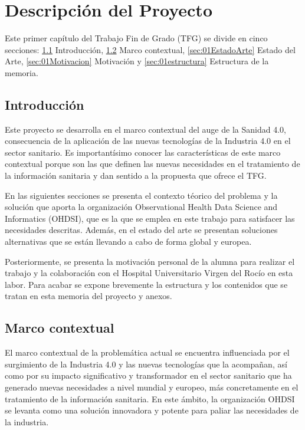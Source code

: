 \chapter{Descripción del Proyecto}\label{cap:01introduccion}

Este primer capítulo del Trabajo Fin de Grado (TFG) se divide en cinco secciones: \ref{sec:01intro} Introducción, \ref{sec:01Contexto} Marco contextual, \ref{sec:01EstadoArte} Estado del Arte, \ref{sec:01Motivacion} Motivación y \ref{sec:01estructura} Estructura de la memoria.

\section{Introducción} \label{sec:01intro}

Este proyecto se desarrolla en el marco contextual del auge de la Sanidad 4.0, consecuencia de la aplicación de las nuevas tecnologías de la Industria 4.0 en el sector sanitario. Es importantísimo conocer las características de este marco contextual porque son las que definen las nuevas necesidades en el tratamiento de la información sanitaria y dan sentido a la propuesta que ofrece el TFG.

En las siguientes secciones se presenta el contexto téorico del problema y la solución que aporta la organización Observational Health Data Science and Informatics (OHDSI), que es la que se emplea en este trabajo para satisfacer las necesidades descritas. Además, en el estado del arte se presentan soluciones alternativas que se están llevando a cabo de forma global y europea.

Posteriormente, se presenta la motivación personal de la alumna para realizar el trabajo y la colaboración con el Hospital Universitario Virgen del Rocío en esta labor. Para acabar se expone brevemente la estructura y los contenidos que se tratan en esta memoria del proyecto y anexos.


\section{Marco contextual} \label{sec:01Contexto} 

El marco contextual de la problemática actual se encuentra influenciada por el surgimiento de la Industria 4.0 y las nuevas tecnologías que la acompañan, así como por su impacto significativo y transformador en el sector sanitario que ha generado nuevas necesidades a nivel mundial y europeo, más concretamente en el tratamiento de la información sanitaria. En este ámbito, la organización OHDSI se levanta como una solución innovadora y potente para paliar las necesidades de la industria.

